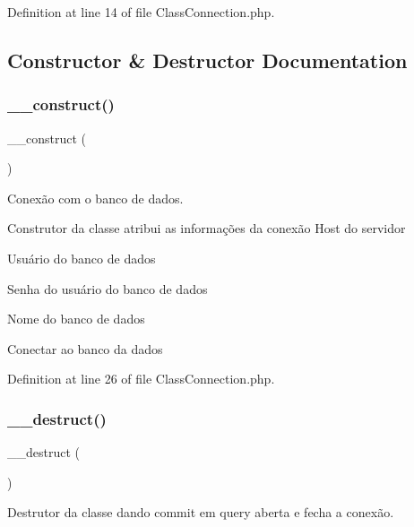 Definition at line 14 of file Class\+Connection.\+php.



\subsection{Constructor \& Destructor Documentation}
\mbox{\label{class_class_connection_a095c5d389db211932136b53f25f39685}} 
\subsubsection{\texorpdfstring{\+\_\+\+\_\+construct()}{\_\_construct()}}
{\footnotesize\ttfamily \+\_\+\+\_\+construct (\begin{DoxyParamCaption}{ }\end{DoxyParamCaption})}



Conexão com o banco de dados. 

Construtor da classe atribui as informações da conexão Host do servidor

Usuário do banco de dados

Senha do usuário do banco de dados

Nome do banco de dados

Conectar ao banco da dados 

Definition at line 26 of file Class\+Connection.\+php.

\mbox{\label{class_class_connection_a421831a265621325e1fdd19aace0c758}} 
\subsubsection{\texorpdfstring{\+\_\+\+\_\+destruct()}{\_\_destruct()}}
{\footnotesize\ttfamily \+\_\+\+\_\+destruct (\begin{DoxyParamCaption}{ }\end{DoxyParamCaption})}



Destrutor da classe dando commit em query aberta e fecha a conexão. 



